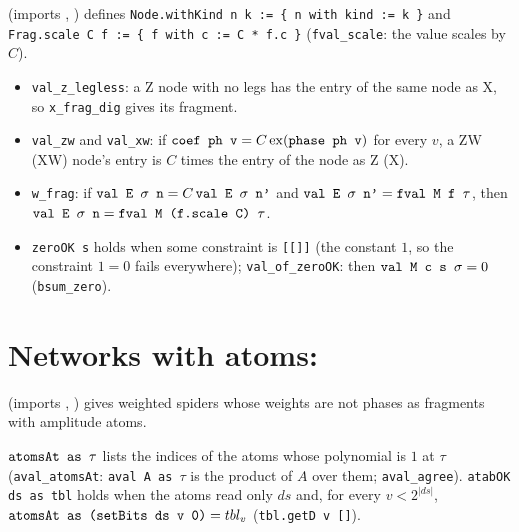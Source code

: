  (imports , ) defines
\textnormal{\texttt{Node.\allowbreak{}withKind n k := \{ n with kind := k \}}} and \textnormal{\texttt{Frag.\allowbreak{}scale C f := \{ f with c := C * f.\allowbreak{}c \}}}
(\textnormal{\texttt{fval\_\allowbreak{}scale}}: the value scales by $C$).
\begin{itemize}
\item \textnormal{\texttt{val\_\allowbreak{}z\_\allowbreak{}legless}}: a Z node with no legs has the entry of the same node as X, so
  \textnormal{\texttt{x\_\allowbreak{}frag\_\allowbreak{}dig}} gives its fragment.
\item \textnormal{\texttt{val\_\allowbreak{}zw}} and \textnormal{\texttt{val\_\allowbreak{}xw}}: if $\textnormal{\texttt{coef ph v}} = C\operatorname{ex}(\textnormal{\texttt{phase ph v}})$
  for every $v$, a ZW (XW) node's entry is $C$ times the entry of the node as Z (X).
\item \textnormal{\texttt{w\_\allowbreak{}frag}}: if $\textnormal{\texttt{val E \ensuremath{\sigma} n}} = C\,\textnormal{\texttt{val E \ensuremath{\sigma} n'}}$ and $\textnormal{\texttt{val E \ensuremath{\sigma} n'}} = \textnormal{\texttt{fval M f \ensuremath{\tau}}}$,
  then $\textnormal{\texttt{val E \ensuremath{\sigma} n}} = \textnormal{\texttt{fval M (\allowbreak{}f.\allowbreak{}scale C) \ensuremath{\tau}}}$.
\item \textnormal{\texttt{zeroOK s}} holds when some constraint is \textnormal{\texttt{[[]]}} (the constant $1$, so the
  constraint $1=0$ fails everywhere); \textnormal{\texttt{val\_\allowbreak{}of\_\allowbreak{}zeroOK}}: then $\textnormal{\texttt{val M c s \ensuremath{\sigma}}} = 0$
  (\textnormal{\texttt{bsum\_\allowbreak{}zero}}).
\end{itemize}

\section{Networks with atoms: \texorpdfstring{}{PathSumNetAmp}}\label{sec:lean-pathsum-netamp}

 (imports , ) gives weighted spiders whose
weights are not phases as fragments with amplitude atoms.

\begin{definition}\label{def:lean-pathsum-atab}
$\textnormal{\texttt{atomsAt as \ensuremath{\tau}}}$ lists the indices of the atoms whose polynomial is $1$ at $\tau$
(\textnormal{\texttt{aval\_\allowbreak{}atomsAt}}: \textnormal{\texttt{aval A as \ensuremath{\tau}}} is the product of $A$ over them; \textnormal{\texttt{aval\_\allowbreak{}agree}}).
\textnormal{\texttt{atabOK ds as tbl}} holds when the atoms read only $ds$ and, for every $v<2^{|ds|}$,
$\textnormal{\texttt{atomsAt as (\allowbreak{}setBits ds v 0)}} = tbl_v$ (\textnormal{\texttt{tbl.\allowbreak{}getD v []}}).
\end{definition}


